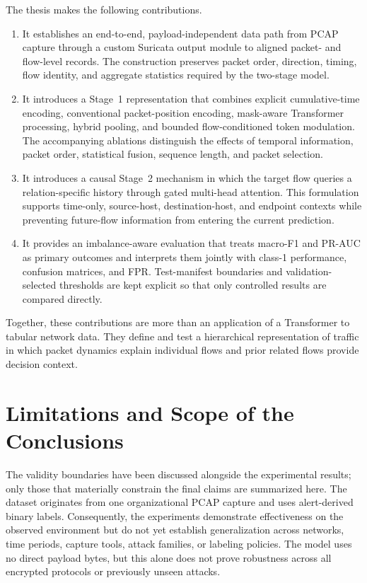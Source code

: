 The thesis makes the following contributions.

\begin{enumerate}
    \item It establishes an end-to-end, payload-independent data path from PCAP
    capture through a custom Suricata output module to aligned packet- and
    flow-level records. The construction preserves packet order, direction,
    timing, flow identity, and aggregate statistics required by the two-stage
    model.

    \item It introduces a Stage~1 representation that combines explicit
    cumulative-time encoding, conventional packet-position encoding,
    mask-aware Transformer processing, hybrid pooling, and bounded
    flow-conditioned token modulation. The accompanying ablations distinguish
    the effects of temporal information, packet order, statistical fusion,
    sequence length, and packet selection.

    \item It introduces a causal Stage~2 mechanism in which the target flow
    queries a relation-specific history through gated multi-head attention.
    This formulation supports time-only, source-host, destination-host, and
    endpoint contexts while preventing future-flow information from entering
    the current prediction.

    \item It provides an imbalance-aware evaluation that treats macro-F1 and
    PR-AUC as primary outcomes and interprets them jointly with class-1
    performance, confusion matrices, and FPR. Test-manifest boundaries and
    validation-selected thresholds are kept explicit so that only controlled
    results are compared directly.
\end{enumerate}

Together, these contributions are more than an application of a Transformer to
tabular network data. They define and test a hierarchical representation of
traffic in which packet dynamics explain individual flows and prior related
flows provide decision context.

\section{Limitations and Scope of the Conclusions}
\label{subsec:conclusion_limitations}

The validity boundaries have been discussed alongside the experimental results;
only those that materially constrain the final claims are summarized here. The
dataset originates from one organizational PCAP capture and uses alert-derived
binary labels. Consequently, the experiments demonstrate effectiveness on the
observed environment but do not yet establish generalization across networks,
time periods, capture tools, attack families, or labeling policies. The model
uses no direct payload bytes, but this alone does not prove robustness across
all encrypted protocols or previously unseen attacks.

